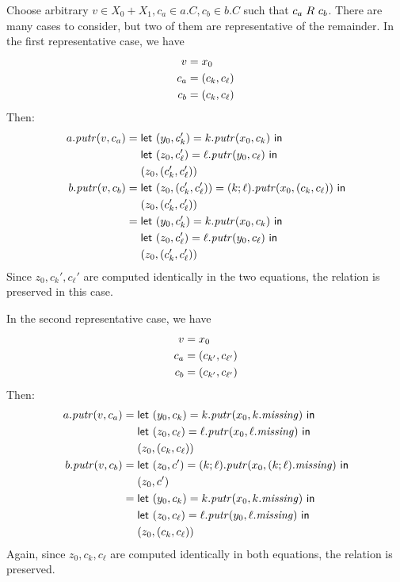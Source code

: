 \begin{defn}[$R$-similarity]
\begin{theorem}
\begin{lemma}
\begin{theorem}[No products]
\begin{lemma}
\begin{functoriality}
Choose arbitrary $v \in X_0+X_1,c_a \in a.C,c_b \in b.C$ such that $c_a
\mathrel{R_{}} c_b$. There are many cases to consider, but two of them are
representative of the remainder. In the first representative case, we have
\begin{align*}
    v &=  x_0 \\
    c_a &= ( c_k,  c_\ell) \\
    c_b &=  (c_k,c_\ell)
\end{align*}
Then:
\begin{align*}
    a.\mathit{putr}(v,c_a) ={}
    & \mathsf{let}\  (y_0,c_k') = k.\mathit{putr}(x_0,c_k) \ \mathsf{in} \\
    & \mathsf{let}\  (z_0,c_\ell') = \ell.\mathit{putr}(y_0,c_\ell) \ \mathsf{in} \\
    & ( z_0,( c_k', c_\ell')) \\
    b.\mathit{putr}(v,c_b) ={}
    & \mathsf{let}\  (z_0,(c_k',c_\ell')) = (k;\ell).\mathit{putr}(x_0,(c_k,c_\ell)) \ \mathsf{in} \\
    & ( z_0, (c_k',c_\ell')) \\
    ={}
    & \mathsf{let}\  (y_0,c_k') = k.\mathit{putr}(x_0,c_k) \ \mathsf{in} \\
    & \mathsf{let}\  (z_0,c_\ell') = \ell.\mathit{putr}(y_0,c_\ell) \ \mathsf{in} \\
    & ( z_0, (c_k',c_\ell'))
\end{align*}
Since $z_0,c_k',c_\ell'$ are computed identically in the two equations, the
relation is preserved in this case.

In the second representative case, we have
\begin{align*}
    v &=  x_0 \\
    c_a &= ( c_{k'},  c_{\ell'}) \\
    c_b &=  (c_{k'},c_{\ell'})
\end{align*}
Then:
\begin{align*}
    a.\mathit{putr}(v,c_a) ={}
    & \mathsf{let}\ (y_0,c_k) = k.\mathit{putr}(x_0,k.\mathit{missing}) \ \mathsf{in} \\
    & \mathsf{let}\ (z_0,c_\ell) = \ell.\mathit{putr}(x_0,\ell.\mathit{missing}) \ \mathsf{in} \\
    & ( z_0,( c_k, c_\ell)) \\
    b.\mathit{putr}(v,c_b) ={}
    & \mathsf{let}\ (z_0,c') = (k;\ell).\mathit{putr}(x_0,(k;\ell).\mathit{missing}) \ \mathsf{in} \\
    & ( z_0, c') \\
    ={}
    & \mathsf{let}\ (y_0,c_k) = k.\mathit{putr}(x_0,k.\mathit{missing}) \ \mathsf{in} \\
    & \mathsf{let}\ (z_0,c_\ell) = \ell.\mathit{putr}(y_0,\ell.\mathit{missing}) \ \mathsf{in} \\
    & ( z_0, (c_k,c_\ell))
\end{align*}
Again, since $z_0,c_k,c_\ell$ are computed identically in both equations,
the relation is preserved.
\end{functoriality}
\fi


\end{lemma}
\end{theorem}
\end{lemma}
\end{theorem}
\end{defn}
